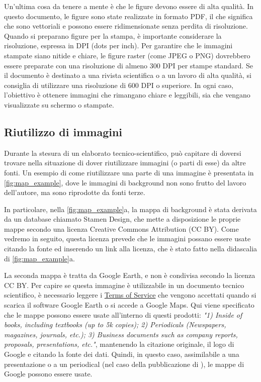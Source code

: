 \documentclass[9pt,a4paper,twoside]{rho-class/rho}
\begin{document}
Un’ultima cosa da tenere a mente è che le figure devono essere di alta qualità. In questo documento, le figure sono state realizzate in formato PDF, il che significa che sono vettoriali e possono essere ridimensionate senza perdita di risoluzione. Quando si preparano figure per la stampa, è importante considerare la risoluzione, espressa in DPI (dots per inch). Per garantire che le immagini stampate siano nitide e chiare, le figure raster (come JPEG o PNG) dovrebbero essere preparate con una risoluzione di almeno 300 DPI per stampe standard. Se il documento è destinato a una rivista scientifica o a un lavoro di alta qualità, si consiglia di utilizzare una risoluzione di 600 DPI o superiore. In ogni caso, l’obiettivo è ottenere immagini che rimangano chiare e leggibili, sia che vengano visualizzate su schermo o stampate.

\subsection{Riutilizzo di immagini}
Durante la stesura di un elaborato tecnico-scientifico, può capitare di doversi trovare nella situazione di dover riutilizzare immagini (o parti di esse) da altre fonti. Un esempio di come riutilizzare una parte di una immagine è presentata in \autoref{fig:map_example}, dove le immagini di background non sono frutto del lavoro dell'autore, ma sono riprodotte da fonti terze. 

In particolare, nella \autoref{fig:map_example}a, la mappa di background è stata derivata da un database chiamato Stamen Design, che mette a disposizione le proprie mappe secondo una licenza Creative Commons Attribution (CC BY). Come vedremo in seguito, questa licenza prevede che le immagini possano essere usate citando la fonte ed inserendo un link alla licenza, che è stato fatto nella didascalia di \autoref{fig:map_example}a. 

La seconda mappa è tratta da Google Earth, e non è condivisa secondo la licenza CC BY. Per capire se questa immagine è utilizzabile in un documento tecnico scientifico, è necessario leggere i \href{https://about.google/brand-resource-center/products-and-services/geo-guidelines/}{Terms of Service} che vengono accettati quando si scarica il software Google Earth o si accede a Google Maps. Qui viene specificato che le mappe possono essere usate all'interno di questi prodotti: \textit{"1) Inside of books, including textbooks (up to 5k copies); 2) Periodicals (Newspapers, magazines, journals, etc.); 3) Business documents such as company reports, proposals, presentations, etc."}, mantenendo la citazione originale, il logo di Google e citando la fonte dei dati. Quindi, in questo caso, assimilabile a una presentazione o a un periodical (nel caso della pubblicazione di \cite{mann_multi-decadal_2023}), le mappe di Google possono essere usate.
\end{document}
